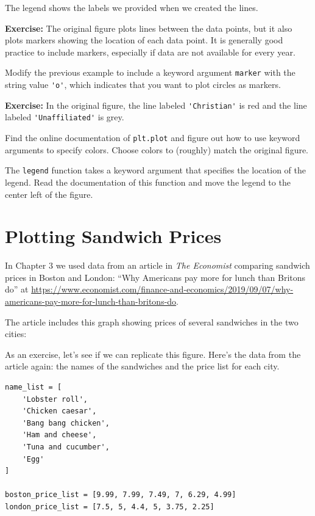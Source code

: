 The legend shows the labels we provided when we created the lines.

\textbf{Exercise:} The original figure plots lines between the data
points, but it also plots markers showing the location of each data
point. It is generally good practice to include markers, especially if
data are not available for every year.

Modify the previous example to include a keyword argument
\passthrough{\lstinline!marker!} with the string value
\passthrough{\lstinline!'o'!}, which indicates that you want to plot
circles as markers.

\textbf{Exercise:} In the original figure, the line labeled
\passthrough{\lstinline!'Christian'!} is red and the line labeled
\passthrough{\lstinline!'Unaffiliated'!} is grey.

Find the online documentation of \passthrough{\lstinline!plt.plot!} and
figure out how to use keyword arguments to specify colors. Choose colors
to (roughly) match the original figure.

The \passthrough{\lstinline!legend!} function takes a keyword argument
that specifies the location of the legend. Read the documentation of
this function and move the legend to the center left of the figure.

\hypertarget{plotting-sandwich-prices}{%
\section{Plotting Sandwich Prices}\label{plotting-sandwich-prices}}

In Chapter 3 we used data from an article in \emph{The Economist}
comparing sandwich prices in Boston and London: ``Why Americans pay more
for lunch than Britons do'' at
\url{https://www.economist.com/finance-and-economics/2019/09/07/why-americans-pay-more-for-lunch-than-britons-do}.

The article includes this graph showing prices of several sandwiches in
the two cities:

As an exercise, let's see if we can replicate this figure. Here's the
data from the article again: the names of the sandwiches and the price
list for each city.

\begin{lstlisting}[]
name_list = [
    'Lobster roll',
    'Chicken caesar',
    'Bang bang chicken',
    'Ham and cheese',
    'Tuna and cucumber',
    'Egg'
]

boston_price_list = [9.99, 7.99, 7.49, 7, 6.29, 4.99]
london_price_list = [7.5, 5, 4.4, 5, 3.75, 2.25]
\end{lstlisting}

